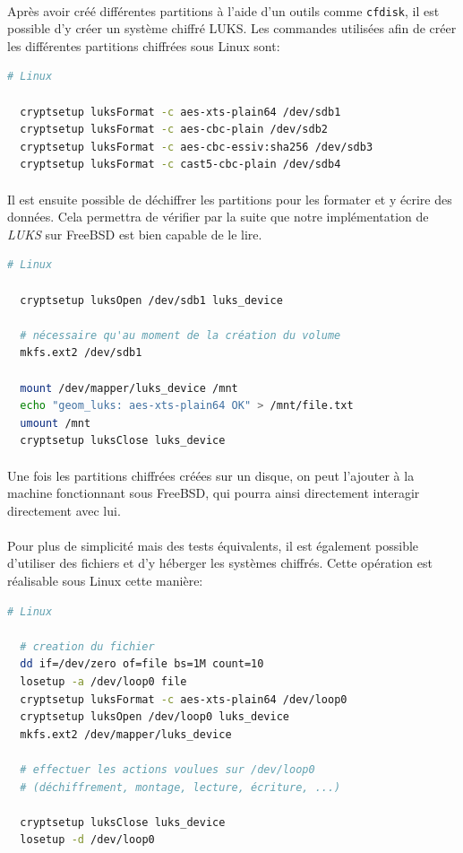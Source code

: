 \paragraph{}
Après avoir créé différentes partitions à l'aide d'un outils comme
\texttt{cfdisk}, il est possible d'y créer un système chiffré LUKS. Les
commandes utilisées afin de créer les différentes partitions chiffrées sous
Linux sont:
\\
\begin{lstlisting}[language=bash]
  # Linux
  
  cryptsetup luksFormat -c aes-xts-plain64 /dev/sdb1
  cryptsetup luksFormat -c aes-cbc-plain /dev/sdb2
  cryptsetup luksFormat -c aes-cbc-essiv:sha256 /dev/sdb3
  cryptsetup luksFormat -c cast5-cbc-plain /dev/sdb4
\end{lstlisting}
\paragraph{}
Il est ensuite possible de déchiffrer les partitions pour les formater et y
écrire des données. Cela permettra de vérifier par la suite que notre
implémentation de \textit{LUKS} sur FreeBSD est bien capable de le lire.
\\
\begin{lstlisting}[language=bash]
  # Linux
  
  cryptsetup luksOpen /dev/sdb1 luks_device

  # nécessaire qu'au moment de la création du volume
  mkfs.ext2 /dev/sdb1
  
  mount /dev/mapper/luks_device /mnt
  echo "geom_luks: aes-xts-plain64 OK" > /mnt/file.txt
  umount /mnt
  cryptsetup luksClose luks_device
\end{lstlisting}
\paragraph{}
Une fois les partitions chiffrées créées sur un disque, on peut l'ajouter à la
machine fonctionnant sous FreeBSD, qui pourra ainsi directement interagir
directement avec lui.
\paragraph{}
Pour plus de simplicité mais des tests équivalents, il est également possible
d'utiliser des fichiers et d'y héberger les systèmes chiffrés. Cette opération
est réalisable sous Linux cette manière:
\\
\begin{lstlisting}[language=bash]
  # Linux
  
  # creation du fichier
  dd if=/dev/zero of=file bs=1M count=10
  losetup -a /dev/loop0 file
  cryptsetup luksFormat -c aes-xts-plain64 /dev/loop0
  cryptsetup luksOpen /dev/loop0 luks_device
  mkfs.ext2 /dev/mapper/luks_device

  # effectuer les actions voulues sur /dev/loop0
  # (déchiffrement, montage, lecture, écriture, ...)

  cryptsetup luksClose luks_device
  losetup -d /dev/loop0
\end{lstlisting}
